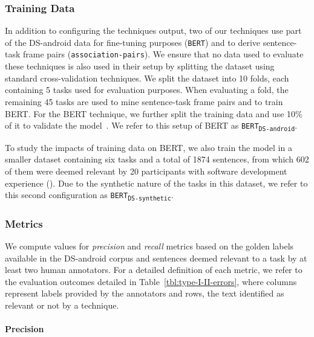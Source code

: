 \subsubsection{Training Data}


In addition to configuring the techniques output, two of our techniques use part of the  \acs{DS-android} data for fine-tuning purposes (\texttt{BERT}) and to derive sentence-task frame pairs (\texttt{association-pairs}).
We ensure that no data used to evaluate these techniques is also used in their setup by 
splitting the dataset using standard cross-validation techniques.
We split the dataset into 10 folds, each containing 5 tasks used for evaluation purposes. When evaluating a fold, the remaining 45 tasks are used to mine sentence-task frame pairs
and to train BERT. 
For the BERT technique, we further split the training data and use 10\% of it to validate the model~\cite{Chaparro2017, fucci2019, Petrosyan2015}.
We refer to this setup of BERT as \texttt{BERT\textsubscript{DS-android}}.


To study the impacts of training data on BERT, we also train the model in a smaller dataset containing six tasks and a total of 1874 sentences, from which 602 of them were deemed relevant by 20 participants with software development experience (). Due to the synthetic nature of the tasks in this dataset, we refer to this 
second configuration as \texttt{BERT\textsubscript{DS-synthetic}}.




\subsubsection{Metrics}


We compute values for \textit{precision} and \textit{recall} metrics based on the golden labels available in the \acs{DS-android} corpus and sentences deemed relevant to a task by at least two human annotators.
For a detailed definition of each metric, we refer to the evaluation outcomes detailed in Table~\ref{tbl:type-I-II-errors}, where  columns represent  labels provided by the annotators and rows,
the text identified as relevant or not by a technique.

% 

\medskip




\paragraph{\textbf{Precision}}


